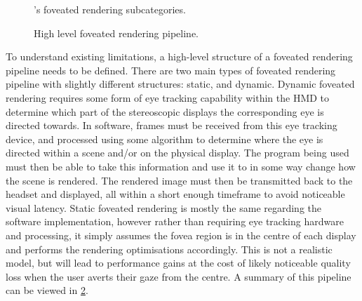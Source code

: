 \documentclass[a4paper,11pt]{article}
\begin{document}
\begin{figure}
  \begin{center}
    
    \caption{\citeauthor{mohanto2022integrative}'s\cite{mohanto2022integrative} foveated rendering subcategories.}
    \label{fig:types}
  \end{center}
\end{figure}

\begin{figure}
  \begin{center}
    
    \caption{High level foveated rendering pipeline.}
    \label{fig:pipeline}
  \end{center}
\end{figure}

To understand existing limitations, a high-level structure of a foveated rendering pipeline needs to be defined. There are two main types of foveated rendering pipeline with slightly different structures: static, and dynamic. Dynamic foveated rendering requires some form of eye tracking capability within the HMD to determine which part of the stereoscopic displays the corresponding eye is directed towards. In software, frames must be received from this eye tracking device, and processed using some algorithm to determine where the eye is directed within a scene and/or on the physical display. The program being used must then be able to take this information and use it to in some way change how the scene is rendered. The rendered image must then be transmitted back to the headset and displayed, all within a short enough timeframe to avoid noticeable visual latency. Static foveated rendering is mostly the same regarding the software implementation, however rather than requiring eye tracking hardware and processing, it simply assumes the fovea region is in the centre of each display and performs the rendering optimisations accordingly. This is not a realistic model, but will lead to performance gains at the cost of likely noticeable quality loss when the user averts their gaze from the centre. A summary of this pipeline can be viewed in \cref{fig:pipeline}.
\end{document}

